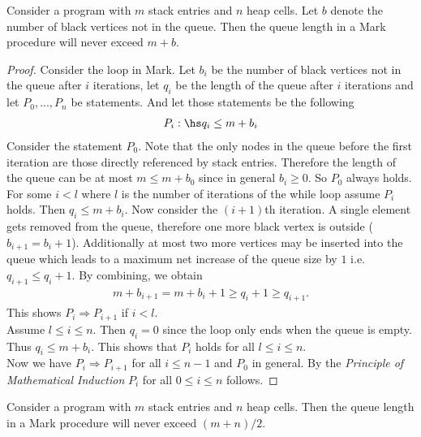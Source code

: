 \documentclass{article}
\begin{document}
\begin{claim}
    \label{claimb}
    Consider a program with $m$ stack entries and $n$ heap cells. 
    Let $b$ denote the number of black vertices not in the queue. Then 
    the queue length in a Mark procedure will never exceed $m+b$.
\end{claim}

\begin{proof}
    Consider the loop in Mark.
    Let $b_i$ be the number of black vertices not in the queue after $i$ iterations,
    let $q_i$ be the length of the queue after $i$ iterations and 
    let $P_0,...,P_n$ be statements. And let those statements be
    the following
    \begin{align*}
        P_i:\hs q_i \leq m+b_i
    \end{align*}
    Consider the statement $P_0$. Note that the only nodes in the queue before
    the first iteration are those directly referenced by stack entries. Therefore
    the length of the queue can be at most $m\leq m+b_0$ since in general $b_i\geq 0$. 
    So $P_0$ always holds.\\
    \indent For some $i<l$ where $l$ is the number of iterations of the while loop
    assume $P_i$ holds. Then $q_i\leq m+b_i$. Now consider the
    $(i+1)$th iteration. A single element gets removed from the queue, therefore
    one more black vertex is outside ($b_{i+1}= b_i + 1$). Additionally
    at most two more vertices may be inserted into the queue which leads to a
    maximum net increase of the queue size by $1$ i.e. $q_{i+1}\leq q_i + 1$.
    By combining, we obtain 
    \begin{align*}
        m + b_{i+1} = m + b_{i} + 1 \geq q_{i} + 1 \geq q_{i+1}.
    \end{align*}
    This shows $P_i\Rightarrow P_{i+1}$ if $i<l$.\\
    \indent Assume $l\leq i \leq n$. Then $q_i = 0$ since the loop only ends
    when the queue is empty. Thus $q_i \leq m + b_i$. This shows that
    $P_i$ holds for all $l\leq i\leq n$.\\
    Now we have $P_i\Rightarrow P_{i+1}$ for all $i\leq n-1$ and $P_0$ in
    general. By the \emph{Principle of Mathematical Induction}
    $P_i$ for all $0\leq i\leq n$ follows. 
\end{proof}

\begin{claim}
    Consider a program with $m$ stack entries and $n$ heap cells. 
    Then the queue length in a Mark procedure will never exceed $(m+n)/2$.
\end{claim}
\end{document}

